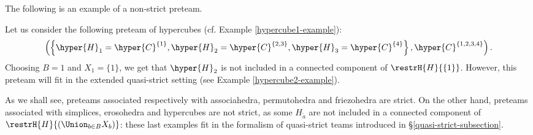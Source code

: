The following is an example of a non-strict preteam.
 \begin{example} \label{exple:hypercubeNotStrict}
 Let us consider the following preteam of hypercubes (cf. Example \ref{hypercube1-example}):
 \begin{equation*}
 \left(\left\lbrace\hyper{H}_1= \hyper{C}^{\{1\}}, \hyper{H}_2= \hyper{C}^{\{2,3\}}, \hyper{H}_3=\hyper{C}^{\{4\}}   \right\rbrace, \hyper{C}^{\{1,2,3,4\}} \right). 
 \end{equation*}
 Choosing $B=1$ and $X_1=\{1\}$, we get that $\hyper{H}_2$ is not included in a connected component of $\restrH{H}{\{1\}}$. However, this preteam will fit in the extended quasi-strict setting (see Example \ref{hypercube2-example}).
 \demo
\end{example}
As we shall see, preteams associated respectively with associahedra, permutohedra and friezohedra are strict. 
On the other hand,  preteams associated with simplices, erosohedra and hypercubes are not strict, as some $H_{\tilde{a}}$ are not included in a connected component of    $\restrH{H}{(\Union_{b\in B}X_b)}$:
these last examples fit in the formalism of quasi-strict teams introduced in  \S\ref{quasi-strict-subsection}.  



